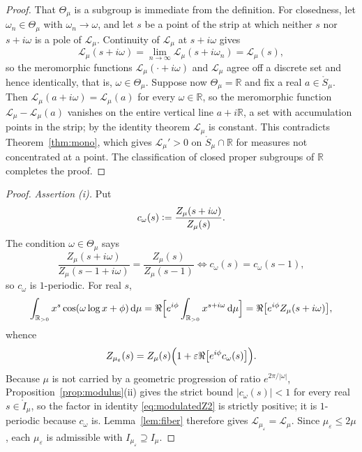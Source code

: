 \documentclass[sn-mathphys-num]{sn-jnl}
\theoremstyle{thmstyleone}%
\theoremstyle{thmstyletwo}%
\theoremstyle{thmstylethree}%
\theoremstyle{thmstyleone}%
\providecommand{\R}{\mathbb{R}}
\providecommand{\Rpos}{\mathbb{R}_{>0}}
\providecommand{\Leh}{\mathscr{L}}
\providecommand{\dd}{\,\mathrm{d}}
\providecommand{\eqdef}{\mathrel{\vcentcolon=}}
\begin{document}
\begin{appendices}
		\propPistructure*
		
		\begin{proof}
			That $\Theta_\mu$ is a subgroup is immediate from the definition. For
			closedness, let $\omega_n\in\Theta_\mu$ with $\omega_n\to\omega$, and
			let $s$ be a point of the strip at which neither $s$ nor $s+i\omega$
			is a pole of $\Leh_\mu$. Continuity of $\Leh_\mu$ at $s+i\omega$
			gives
			\begin{equation}\label{eq:closedproof}
				\Leh_\mu(s+i\omega)=\lim_{n\to\infty}\Leh_\mu(s+i\omega_n)
				=\Leh_\mu(s),
			\end{equation}
			so the meromorphic functions $\Leh_\mu(\cdot+i\omega)$ and
			$\Leh_\mu$ agree off a discrete set and hence identically, that
			is, $\omega\in\Theta_\mu$. Suppose now $\Theta_\mu=\R$ and fix a real
			$a\in\mathring S_\mu$. Then $\Leh_\mu(a+i\omega)=\Leh_\mu(a)$ for
			every $\omega\in\R$, so the meromorphic function
			$\Leh_\mu-\Leh_\mu(a)$ vanishes on the entire vertical line
			$a+i\R$, a set with accumulation points in the strip; by the
			identity theorem $\Leh_\mu$ is constant. This contradicts
			Theorem~\ref{thm:mono}, which gives $\Leh_\mu'>0$ on
			$\mathring S_\mu\cap\R$ for measures not concentrated at a point.
			The classification of closed proper subgroups of $\R$ completes
			the proof.
		\end{proof}
		
		\thmresonant*
		
		\begin{proof}
			\emph{Assertion (i).} Put
			\begin{equation}\label{eq:comegadef}
				c_\omega(s)\eqdef\frac{Z_\mu(s+i\omega)}{Z_\mu(s)} .
			\end{equation}
			The condition $\omega\in\Theta_\mu$ says
			\begin{equation}\label{eq:comegaperiodic}
				\frac{Z_\mu(s+i\omega)}{Z_\mu(s-1+i\omega)}
				=\frac{Z_\mu(s)}{Z_\mu(s-1)}
				\iff
				c_\omega(s)=c_\omega(s-1),
			\end{equation}
			so $c_\omega$ is $1$-periodic. For real $s$,
			\begin{equation}\label{eq:modulatedZ}
				\int_{\Rpos}x^{s}\cos(\omega\log x+\phi)\dd\mu
				=\Re\Bigl[e^{i\phi}\int_{\Rpos}x^{s+i\omega}\dd\mu\Bigr]
				=\Re\bigl[e^{i\phi}Z_\mu(s+i\omega)\bigr],
			\end{equation}
			whence
			\begin{equation}\label{eq:modulatedZ2}
				Z_{\mu_\varepsilon}(s)
				=Z_\mu(s)\Bigl(1+\varepsilon
				\Re\bigl[e^{i\phi}c_\omega(s)\bigr]\Bigr).
			\end{equation}
			Because $\mu$ is not carried by a geometric progression of
			ratio $e^{2\pi/|\omega|}$, Proposition~\ref{prop:modulus}(ii)
			gives the strict bound $|c_\omega(s)|<1$ for every real
			$s\in\mathring I_\mu$, so the factor in identity \eqref{eq:modulatedZ2}
			is strictly positive; it is $1$-periodic because $c_\omega$
			is. Lemma~\ref{lem:fiber} therefore gives
			$\Leh_{\mu_\varepsilon}=\Leh_\mu$. Since
			$\mu_\varepsilon\le2\mu$, each $\mu_\varepsilon$ is
			admissible with $I_{\mu_\varepsilon}\supseteq I_\mu$.
			

\end{proof}
\end{appendices}
\end{document}
